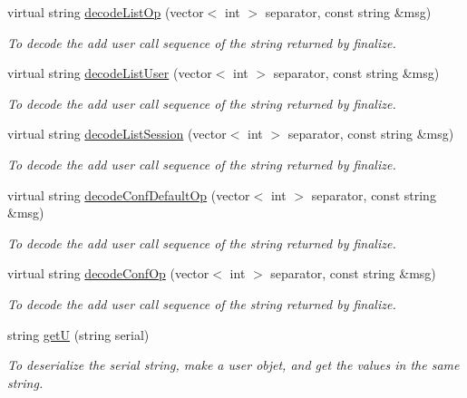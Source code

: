\begin{DoxyCompactItemize}
virtual string \hyperlink{classUMSMapper_a72267ca71cc620570a238dfec3f0519f}{decodeListOp} (vector$<$ int $>$ separator, const string \&msg)
\begin{DoxyCompactList}\small\item\em To decode the add user call sequence of the string returned by finalize. \item\end{DoxyCompactList}\item 
virtual string \hyperlink{classUMSMapper_a569b2de623104e451711ff14b1f8f84f}{decodeListUser} (vector$<$ int $>$ separator, const string \&msg)
\begin{DoxyCompactList}\small\item\em To decode the add user call sequence of the string returned by finalize. \item\end{DoxyCompactList}\item 
virtual string \hyperlink{classUMSMapper_a750e6d307c48491a86a97d694807ca66}{decodeListSession} (vector$<$ int $>$ separator, const string \&msg)
\begin{DoxyCompactList}\small\item\em To decode the add user call sequence of the string returned by finalize. \item\end{DoxyCompactList}\item 
virtual string \hyperlink{classUMSMapper_ad157fb31bec53a8c140fb2e2d60465b3}{decodeConfDefaultOp} (vector$<$ int $>$ separator, const string \&msg)
\begin{DoxyCompactList}\small\item\em To decode the add user call sequence of the string returned by finalize. \item\end{DoxyCompactList}\item 
virtual string \hyperlink{classUMSMapper_ac1f47841882d3f85b8820ab836789036}{decodeConfOp} (vector$<$ int $>$ separator, const string \&msg)
\begin{DoxyCompactList}\small\item\em To decode the add user call sequence of the string returned by finalize. \item\end{DoxyCompactList}\item 
string \hyperlink{classUMSMapper_a60bb02d794c885f5e0feae133af7058d}{getU} (string serial)
\begin{DoxyCompactList}\small\item\em To deserialize the serial string, make a user objet, and get the values in the same string. \item\end{DoxyCompactList}\item 

\end{DoxyCompactItemize}
